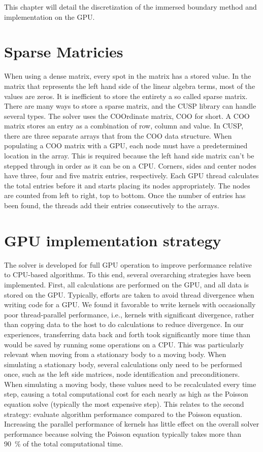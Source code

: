 \documentclass[onehalf,11pt]{beavtex}
\begin{document}
This chapter will detail the discretization of the immersed boundary method and implementation on the GPU. 

\section{Sparse Matricies}
When using a dense matrix, every spot in the matrix has a stored value.
In the matrix that represents the left hand side of the linear algebra terms, most of the values are zeros.
It is inefficient to store the entirety a so called sparse matrix.
There are many ways to store a sparse matrix, and the CUSP library can handle several types.
The solver uses the COOrdinate matrix, COO for short.
A COO matrix stores an entry as a combination of row, column and value.
In CUSP, there are three separate arrays that from the COO data structure.
When populating a COO matrix with a GPU, each node must have a predetermined location in the array.
This is required because the left hand side matrix can't be stepped through in order as it can be on a CPU.
Corners, sides and center nodes have three, four and five matrix entries, respectively.
Each GPU thread calculates the total entries before it and starts placing its nodes appropriately.
The nodes are counted from left to right, top to bottom.
Once the number of entries has been found, the threads add their entries consecutively to the arrays.

\section{GPU implementation strategy}
\label{GPU implementation strategy}

The solver is developed for full GPU operation to improve performance relative to CPU-based algorithms.
To this end, several overarching strategies have been implemented.
First, all calculations are performed on the GPU, and all data is stored on the GPU.
Typically, efforts are taken to avoid thread divergence when writing code for a GPU.
We found it favorable to write kernels with occasionally poor thread-parallel performance, i.e., kernels with significant divergence, rather than copying data to the host to do calculations to reduce divergence.
In our experiences, transferring data back and forth took significantly more time than would be saved by running some operations on a CPU.
This was particularly relevant when moving from a stationary body to a moving body.
When simulating a stationary body, several calculations only need to be performed once, such as the left side matrices, node identification and preconditioners.
When simulating a moving body, these values need to be recalculated every time step, causing a total computational cost for each nearly as high as the Poisson equation solve (typically the most expensive step).
This relates to the second strategy: evaluate algorithm performance compared to the Poisson equation.
Increasing the parallel performance of kernels has little effect on the overall solver performance because solving the Poisson equation typically takes more than \SI{90}{\percent} of the total computational time.
\end{document}
